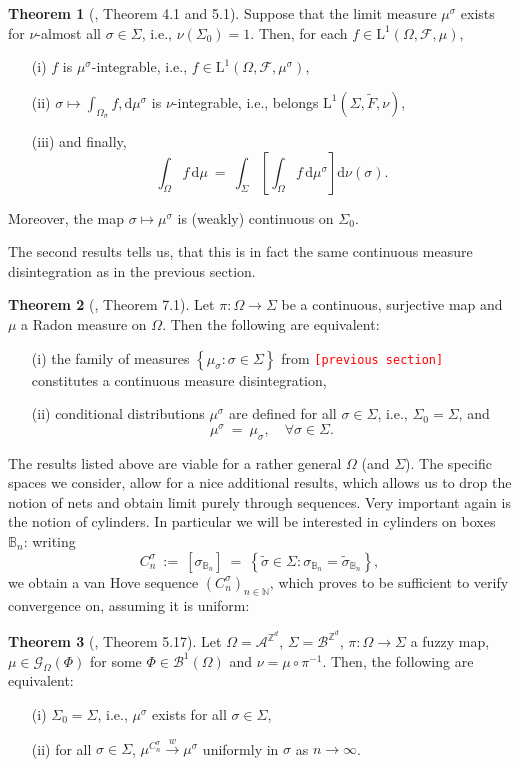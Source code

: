 \documentclass[12pt]{article}
\newcommand{\A}{\mathcal{A}}
\newcommand{\B}{\mathcal{B}}
\newcommand{\BB}{\mathscr{B}}
\newcommand{\BBB}{\mathbb{B}}
\renewcommand{\d}{\mathrm{d}}
\newcommand{\F}{\mathcal{F}}
\newcommand{\G}{\mathcal{G}}
\newcommand{\N}{\mathbb{N}}
\newcommand{\Z}{\mathbb{Z}}
\newcommand{\set}[1]{\left\{#1\right\}}
\newcommand{\oglati}[1]{\left[#1\right]}
\newcommand{\ra}{\rightarrow}
\newcommand{\1}{\mathbbm{1}}
\newcommand{\5}{\vspace{0.5cm}}
\renewcommand{\tilde}{\widetilde}
\theoremstyle{definition}
\newtheorem{thm}{Theorem}[section]
\begin{document}
\begin{thm}[\cite{Tju}, Theorem 4.1 and 5.1]
Suppose that the limit measure $\mu^\sigma$ exists for $\nu$-almost all $\sigma\in\Sigma$, i.e., $\nu(\Sigma_0)=1$. Then, for each $f\in\mathrm{L}^1(\Omega,\F,\mu)$,
\begin{itemize}
	\item[(i)] $f$ is $\mu^\sigma$-integrable, i.e., $f\in\mathrm{L}^1(\Omega,\F,\mu^\sigma)$, 
	\item[(ii)] $\sigma\mapsto\int_{\Omega_\sigma}f,\d\mu^\sigma$ is $\nu$-integrable, i.e., belongs $\mathrm{L}^1(\Sigma,\tilde{F},\nu)$, 
	\item[(iii)] and finally,
	$$\int_\Omega f\,\d\mu ~=~ \int_\Sigma\!\oglati{\int_\Omega f\,\d\mu^\sigma}\!\d\nu(\sigma).$$
\end{itemize}
Moreover, the map $\sigma\mapsto\mu^\sigma$ is (weakly) continuous on $\Sigma_0$.
\end{thm}
The second results tells us, that this is in fact the same continuous measure disintegration as in the previous section.
\begin{thm}[\cite{Tju}, Theorem 7.1]
Let $\pi:\Omega\ra\Sigma$ be a continuous, surjective map and $\mu$ a Radon measure on $\Omega$. Then the following are equivalent:
\begin{itemize}
	\item[(i)] the family of measures $\set{\mu_\sigma:\sigma\in\Sigma}$ from \textcolor{red}{\texttt{[previous section]}} constitutes a continuous measure disintegration,
	\item[(ii)] conditional distributions $\mu^\sigma$ are defined for all $\sigma\in\Sigma$, i.e., $\Sigma_0=\Sigma$, and
	$$\mu^\sigma ~=~ \mu_\sigma, \quad \forall \sigma\in\Sigma.$$
\end{itemize}
\end{thm}

The results listed above are viable for a rather general $\Omega$ (and $\Sigma$). The specific spaces we consider, allow for a nice additional results, which allows us to drop the notion of nets and obtain limit purely through sequences. Very important again is the notion of cylinders. In particular we will be interested in cylinders on boxes $\BBB_n$: writing
$$C_n^\sigma ~:=~ [\sigma_{\BBB_n}] ~=~ \set{\tilde{\sigma}\in\Sigma:\sigma_{\BBB_n}=\tilde{\sigma}_{\BBB_n}},$$
we obtain a van Hove sequence $(C_n^\sigma)_{n\in\N}$, which proves to be sufficient to verify convergence on, assuming it is uniform:
\begin{thm}[\cite{Ber}, Theorem 5.17]
Let $\Omega=\A^{\Z^d}$, $\Sigma=\B^{\Z^d}$, $\pi:\Omega\ra\Sigma$ a fuzzy map, $\mu\in\G_\Omega(\Phi)$ for some $\Phi\in\BB^1(\Omega)$ and $\nu=\mu\circ\pi^{-1}$. Then, the following are equivalent:
\begin{itemize}
	\item[(i)] $\Sigma_0=\Sigma$, i.e., $\mu^\sigma$ exists for all $\sigma\in\Sigma$,
	\item[(ii)] for all $\sigma\in\Sigma$, $\mu^{C_n^\sigma}\xrightarrow{w}\mu^\sigma$ uniformly in $\sigma$ as $n\ra\infty$.
\end{itemize}
\end{thm}
\end{document}
